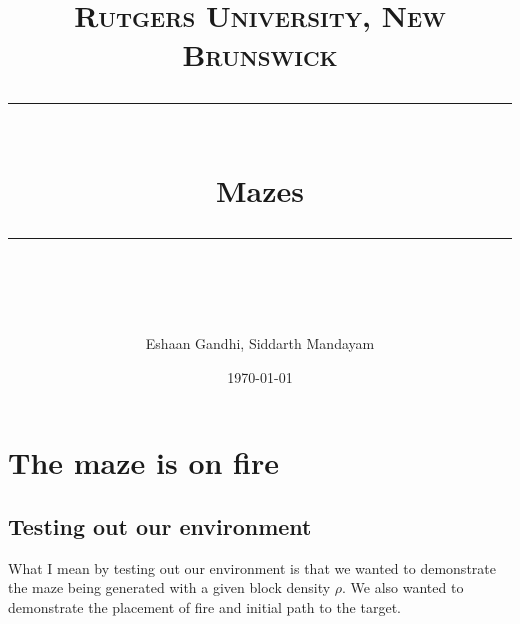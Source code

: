 \documentclass[11pt]{scrartcl} %
\title{	
	\normalfont\normalsize
	\textsc{Rutgers University, New Brunswick}\\ %
	\vspace{25pt} %
	\rule{\linewidth}{0.5pt}\\ %
	\vspace{20pt} %
	{\huge Mazes}\\ %
	\vspace{12pt} %
	\rule{\linewidth}{2pt}\\ %
	\vspace{12pt} %
}
\author{\LARGE Eshaan Gandhi, Siddarth Mandayam} %
\date{\normalsize\today} %
\begin{document}
\maketitle %

\section{The maze is on fire}

\subsection{Testing out our environment}
What I mean by testing out our environment is that we wanted to demonstrate the maze being generated with a given block density $\rho$. We also wanted to demonstrate the placement of fire and initial path to the target.\\
\end{document}
